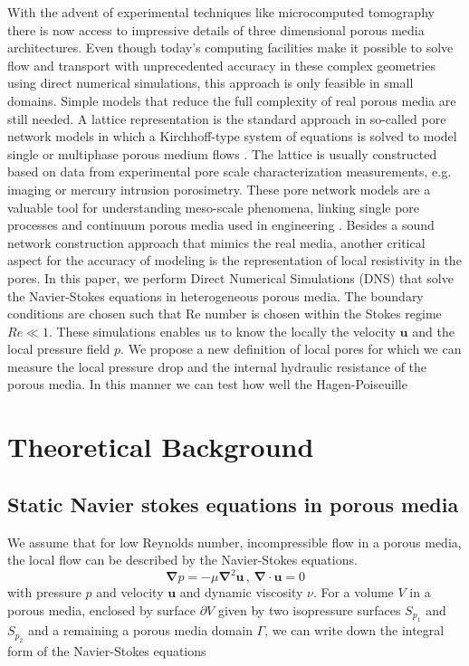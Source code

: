 \documentclass[draft]{agujournal2019}
\begin{document}
With the advent of experimental techniques like microcomputed tomography there is now access to impressive details of three dimensional porous media architectures. Even though today’s computing facilities make it possible to solve flow and transport with unprecedented accuracy in these complex geometries using direct numerical simulations, this approach is only feasible in small domains. Simple models that reduce the full complexity of real porous media are still needed. A lattice representation is the standard approach in so-called pore network models in which a Kirchhoff-type system of equations is solved to model single or multiphase porous medium flows . The lattice is usually constructed based on data from experimental pore scale characterization measurements, e.g. imaging or mercury intrusion porosimetry. These pore network models are a valuable tool for understanding meso-scale phenomena, linking single pore processes and continuum porous media used in engineering . Besides a sound network construction approach that mimics the real media, another critical aspect for the accuracy of modeling is the representation of local resistivity in the pores. In this paper, we perform Direct Numerical Simulations (DNS) that solve the Navier-Stokes equations in heterogeneous porous media. The boundary conditions are chosen such that Re number is chosen within the Stokes regime $Re\ll1$. These simulations enables us to know the locally the velocity $\mathbf{u}$ and the local pressure field $p$. We propose a new definition of local pores for which we can measure the local pressure drop and the internal hydraulic resistance of the porous media. In this manner we can test how well the Hagen-Poiseuille 



\section{Theoretical Background}
\subsection{Static Navier stokes equations in porous media}
We assume that for low Reynolds number, incompressible flow in a porous media, the local flow can be described by the Navier-Stokes equations. 
\begin{equation}
	\mathbf{\nabla} p = - \mu\mathbf{\nabla}^2 \mathbf{u}\,,\,\mathbf{\nabla}\cdot\mathbf{u}=0\label{eq:stokes_local}
	\end{equation}
with pressure $p$ and velocity $\mathbf{u}$ and dynamic viscosity $\nu$. 
For a volume $V$ in a porous media, enclosed by surface $\partial V$ given by two isopressure surfaces $S_{p_1}$ and $S_{p_2}$ and a remaining a porous media domain $\Gamma$, we can write down the integral form of the Navier-Stokes equations
\end{document}
